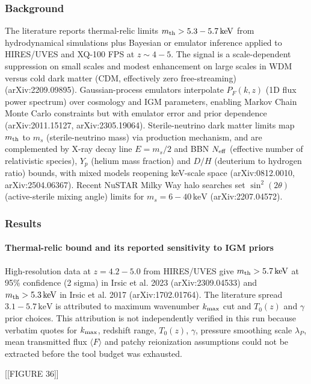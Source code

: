 \documentclass[11pt,a4paper]{article}
\begin{document}
\subsubsection*{Background}
The literature reports thermal-relic limits $m_{\rm th} > 5.3-5.7\,\mathrm{keV}$ from hydrodynamical simulations plus Bayesian or emulator inference applied to HIRES/UVES and XQ-100 FPS at $z \sim 4-5$. The signal is a scale-dependent suppression on small scales and modest enhancement on large scales in WDM versus cold dark matter (CDM, effectively zero free-streaming) (arXiv:2209.09895). Gaussian-process emulators interpolate $P_F(k,z)$ (1D flux power spectrum) over cosmology and IGM parameters, enabling Markov Chain Monte Carlo constraints but with emulator error and prior dependence (arXiv:2011.15127, arXiv:2305.19064). Sterile-neutrino dark matter limits map $m_{\rm th}$ to $m_s$ (sterile-neutrino mass) via production mechanism, and are complemented by X-ray decay line $E = m_s/2$ and BBN $N_{\rm eff}$ (effective number of relativistic species), $Y_p$ (helium mass fraction) and $D/H$ (deuterium to hydrogen ratio) bounds, with mixed models reopening keV-scale space (arXiv:0812.0010, arXiv:2504.06367). Recent NuSTAR Milky Way halo searches set $\sin^2(2\theta)$ (active-sterile mixing angle) limits for $m_s = 6-40\,\mathrm{keV}$ (arXiv:2207.04572).

\subsubsection*{Results}
\paragraph{Thermal-relic bound and its reported sensitivity to IGM priors}
High-resolution data at $z = 4.2-5.0$ from HIRES/UVES give $m_{\rm th} > 5.7\,\mathrm{keV}$ at 95\% confidence (2 sigma) in Irsic et al. 2023 (arXiv:2309.04533) and $m_{\rm th} > 5.3\,\mathrm{keV}$ in Irsic et al. 2017 (arXiv:1702.01764). The literature spread $3.1-5.7\,\mathrm{keV}$ is attributed to maximum wavenumber $k_{\rm max}$ cut and $T_0(z)$ and $\gamma$ prior choices. This attribution is not independently verified in this run because verbatim quotes for $k_{\rm max}$, redshift range, $T_0(z)$, $\gamma$, pressure smoothing scale $\lambda_P$, mean transmitted flux $\langle F \rangle$ and patchy reionization assumptions could not be extracted before the tool budget was exhausted.


[[FIGURE 36]]
\end{document}
